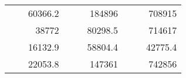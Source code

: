 \begin{table}[H]
\begin{tabular}{|ccrccrccc}
\rowcolor[HTML]{DDFDFF} 
\multicolumn{1}{|c|}{\cellcolor[HTML]{FFFFC7}}                                & \multicolumn{1}{c|}{\cellcolor[HTML]{DDFDFF}}                      & \multicolumn{1}{r|}{\cellcolor[HTML]{DAE8FC}60366.2}   & \multicolumn{1}{c|}{\cellcolor[HTML]{FFFFC7}}                                & \multicolumn{1}{c|}{\cellcolor[HTML]{DDFDFF}}                       & \multicolumn{1}{r|}{\cellcolor[HTML]{DDFDFF}184896}    & \multicolumn{1}{c|}{\cellcolor[HTML]{FFFFC7}}                                & \multicolumn{1}{c|}{\cellcolor[HTML]{DDFDFF}}                      & \multicolumn{1}{r|}{\cellcolor[HTML]{DDFDFF}708915}    \\ \cline{3-3} \cline{6-6} \cline{9-9} 
\multicolumn{1}{|c|}{\cellcolor[HTML]{FFFFC7}}                                & \multicolumn{1}{c|}{\cellcolor[HTML]{DDFDFF}}                      & \multicolumn{1}{r|}{\cellcolor[HTML]{DDFDFF}38772}     & \multicolumn{1}{c|}{\cellcolor[HTML]{FFFFC7}}                                & \multicolumn{1}{c|}{\cellcolor[HTML]{DDFDFF}}                       & \multicolumn{1}{r|}{\cellcolor[HTML]{DAE8FC}80298.5}   & \multicolumn{1}{c|}{\cellcolor[HTML]{FFFFC7}}                                & \multicolumn{1}{c|}{\cellcolor[HTML]{DDFDFF}}                      & \multicolumn{1}{r|}{\cellcolor[HTML]{DAE8FC}714617}    \\ \cline{3-3} \cline{6-6} \cline{9-9} 
\rowcolor[HTML]{DDFDFF} 
\multicolumn{1}{|c|}{\cellcolor[HTML]{FFFFC7}}                                & \multicolumn{1}{c|}{\cellcolor[HTML]{DDFDFF}}                      & \multicolumn{1}{r|}{\cellcolor[HTML]{DAE8FC}16132.9}   & \multicolumn{1}{c|}{\cellcolor[HTML]{FFFFC7}}                                & \multicolumn{1}{c|}{\cellcolor[HTML]{DDFDFF}}                       & \multicolumn{1}{r|}{\cellcolor[HTML]{DDFDFF}58804.4}   & \multicolumn{1}{c|}{\cellcolor[HTML]{FFFFC7}}                                & \multicolumn{1}{c|}{\cellcolor[HTML]{DDFDFF}}                      & \multicolumn{1}{r|}{\cellcolor[HTML]{DDFDFF}42775.4}   \\ \cline{3-3} \cline{6-6} \cline{9-9} 
\multicolumn{1}{|c|}{\cellcolor[HTML]{FFFFC7}}                                & \multicolumn{1}{c|}{\cellcolor[HTML]{DDFDFF}}                      & \multicolumn{1}{r|}{\cellcolor[HTML]{DDFDFF}22053.8}   & \multicolumn{1}{c|}{\cellcolor[HTML]{FFFFC7}}                                & \multicolumn{1}{c|}{\cellcolor[HTML]{DDFDFF}}                       & \multicolumn{1}{r|}{\cellcolor[HTML]{DAE8FC}147361}    & \multicolumn{1}{c|}{\cellcolor[HTML]{FFFFC7}}                                & \multicolumn{1}{c|}{\cellcolor[HTML]{DDFDFF}}                      & \multicolumn{1}{r|}{\cellcolor[HTML]{DAE8FC}742856}    \\ \cline{3-3} \cline{6-6} \cline{9-9} 

\end{tabular}
\end{table}

